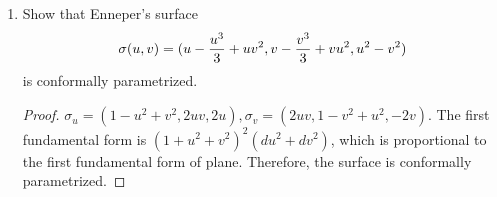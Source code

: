 \documentclass{article}
\begin{document}
\begin{enumerate}
\begin{proof}
\begin{enumerate}[label=(\arabic*)]
Since $\gamma_1'\neq 0$, we can find a neighborhood $N_1 = N(\sigma_1(u,v),\epsilon_1)\cap \sigma_1$, such that
$\sigma_1^{-1}(N_1)$ and $N_1$ is one-to-one. 
Similarly we can find $\sigma_2(u,v) \in N_2 \subseteq \sigma_2$ such that $\sigma_2^{-1}(N_2)$ and $N_2$ is one-to-one.
Let $ K = \sigma_1^{-1}(N_1) \cap \sigma_2^{-1}(N_2)$, then $\sigma_1(K)$ and $\sigma_2(K)$ are one-to-one.
Therefore, we construct a locally smooth mapping $f$ from $\sigma_1(K)$ to $\sigma_2(K)$ as  $\sigma_2 \circ \sigma_1^{-1}$. 
The first fundamental form of $\sigma_1$ 
and $f\circ \sigma_1$ are the same from (1). It follows that $f$ is isometric.
\item By fundamental theorem of curves, it is possible to construct a planar curve with $\kappa(u)$ as curvature. From (2) $\sigma$ is locally
isometric to a plane. 
\end{enumerate}
\end{proof}
\item Show that Enneper's surface 
\begin{equation}
\sigma(u,v)=(u-{u^3\over 3}+uv^2, v-{v^3 \over 3}+vu^2,u^2-v^2)
\end{equation}
is conformally parametrized.
\begin{proof}
$\sigma_u = (1- u^2+v^2,2uv,2u), \sigma_v = (2uv,1-v^2+u^2,-2v)$.
The first fundamental form is $(1+u^2+v^2)^2 (du^2+dv^2)$, which is proportional to the first fundamental form of plane. Therefore, the surface is conformally parametrized.
\end{proof}
\end{enumerate}
\end{document}
